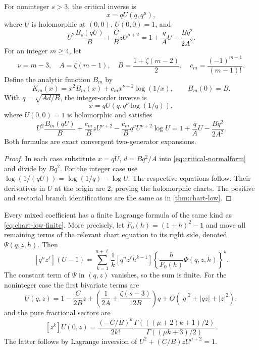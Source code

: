 \begin{theorem}
\label{thm:chart-high}
For noninteger $s>3$, the critical inverse is
\begin{equation}\label{eq:chart-high-inverse}
 x=qU(q,q^\mu),
\end{equation}
where $U$ is holomorphic at $(0,0)$, $U(0,0)=1$, and
\begin{equation}\label{eq:chart-high-equation}
 U^2\frac{B_s(qU)}B+\frac CB zU^{\mu+2}
 =1+\frac qA U-\frac{Bq^2}{2A^2}.
\end{equation}
For an integer $m\ge4$, let
\[
 \nu=m-3,\quad A=\zeta(m-1),\quad
 B=\frac{1+\zeta(m-2)}2,\quad
 c_m=\frac{(-1)^{m-1}}{(m-1)!}.
\]
Define the analytic function $B_m$ by
\[
 K_m(x)=x^2B_m(x)+c_mx^{\nu+2}\log(1/x),\qquad B_m(0)=B.
\]
With $q=\sqrt{Ad/B}$, the integer-order inverse is
\begin{equation}\label{eq:chart-integer-inverse}
 x=qU(q,q^\nu\log(1/q)),
\end{equation}
where $U(0,0)=1$ is holomorphic and satisfies
\begin{equation}\label{eq:chart-integer-equation}
 U^2\frac{B_m(qU)}B+\frac{c_m}{B}zU^{\nu+2}
 -\frac{c_m}{B}q^\nu U^{\nu+2}\log U
 =1+\frac qA U-\frac{Bq^2}{2A^2}.
\end{equation}
Both formulas are exact convergent two-generator expansions.
\end{theorem}

\begin{proof}
In each case substitute $x=qU$, $d=Bq^2/A$ into
\eqref{eq:critical-normalform} and divide by $Bq^2$.
For the integer case use
$\log(1/(qU))=\log(1/q)-\log U$.  The respective equations follow.
Their derivatives in $U$ at the origin are $2$, proving the
holomorphic charts.  The positive and sectorial branch identifications
are the same as in \cref{thm:chart-low}.
\end{proof}

Every mixed coefficient has a finite Lagrange formula of the same kind
as \eqref{eq:chart-low-finite}.  More precisely, let
$F_0(h)=(1+h)^2-1$ and move all remaining terms of the relevant chart
equation to its right side, denoted $\Psi(q,z,h)$.
Then
\begin{equation}\label{eq:chart-high-finite}
 [q^nz^\ell](U-1)=
 \sum_{k=1}^{n+\ell}\frac1k[q^nz^\ell h^{k-1}]
 \left\{\frac h{F_0(h)}\Psi(q,z,h)\right\}^{k}.
\end{equation}
The constant term of $\Psi$ in $(q,z)$ vanishes, so the sum is finite.
For the noninteger case the first bivariate terms are
\begin{equation}\label{eq:chart-high-first}
 U(q,z)=1-\frac C{2B}z+
 \left(\frac1{2A}+\frac{\zeta(s-3)}{12B}\right)q
 +O(|q|^2+|qz|+|z|^2),
\end{equation}
and the pure fractional sectors are
\begin{equation}\label{eq:chart-high-pure}
 [z^k]U(0,z)=\frac{(-C/B)^k}{2k!}
 \frac{\Gamma(((\mu+2)k+1)/2)}{\Gamma((\mu k+3)/2)}.
\end{equation}
The latter follows by Lagrange inversion of
$U^2+(C/B)zU^{\mu+2}=1$.

